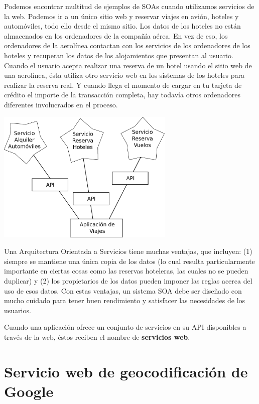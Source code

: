 Podemos encontrar multitud de ejemplos de SOAs cuando utilizamos servicios de la web. Podemos ir a un
único sitio web y reservar viajes en avión, hoteles y automóviles, todo ello desde el
mismo sitio. Los datos de los hoteles no están almacenados en los ordenadores de la
compañía aérea. En vez de eso, los ordenadores de la aerolínea contactan con los servicios
de los ordenadores de los hoteles y recuperan los datos de los alojamientos que presentan al
usuario. Cuando el usuario acepta realizar una reserva de un hotel usando el sitio web
de una aerolínea, ésta utiliza otro servicio web en los sistemas de los hoteles para realizar
la reserva real. Y cuando llega el momento de cargar en tu tarjeta de crédito el importe de la
transacción completa, hay todavía otros ordenadores diferentes involucrados en el proceso.

\beforefig
\centerline{\includegraphics[height=2.50in]{figs2/soa.eps}}
\afterfig

Una Arquitectura Orientada a Servicios tiene muchas ventajas, que incluyen: (1)
siempre se mantiene una única copia de los datos (lo cual resulta particularmente
importante en ciertas cosas como las reservas hoteleras, las cuales no se pueden duplicar)
y (2) los propietarios de los datos pueden imponer las reglas acerca del uso de esos datos.
Con estas ventajas, un sistema SOA debe ser diseñado con mucho cuidado para
tener buen rendimiento y satisfacer las necesidades de los usuarios.

Cuando una aplicación ofrece un conjunto de servicios en su API disponibles a través de la
web, éstos reciben el nombre de {\bf servicios web}.

\section{Servicio web de geocodificación de Google}

